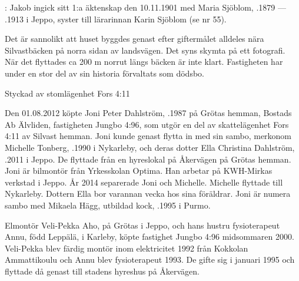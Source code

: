 :
Jakob ingick sitt 1:a äktenskap den 10.11.1901 med Maria Sjöblom, .1879 --- .1913 i Jeppo, syster till lärarinnan Karin Sjöblom (se nr 55).
\begin{jhchildren}
  \item {}
  \item {}
  \item {}
  \item {}
  \item {}
\end{jhchildren}
Det är sannolikt att huset byggdes genast efter giftermålet alldeles nära Silvastbäcken på norra sidan av landsvägen. Det syns skymta på ett fotografi. När det flyttades ca 200 m norrut längs bäcken är inte klart. Fastigheten har under en stor del av sin historia förvaltats som dödsbo.



%

Styckad av stomlägenhet Fors 4:11


%
Den 01.08.2012 köpte Joni Peter Dahlström, .1987 på Grötas hemman, Bostads Ab Älvliden, fastigheten Jungbo 4:96, som	utgör en del av skattelägenhet Fors 4:11 av Silvast hemman. Joni kunde	genast flytta in med sin sambo, merkonom Michelle Tonberg, .1990 i Nykarleby, och deras dotter Ella Christina Dahlström, .2011 i Jeppo. De flyttade från en hyreslokal på Åkervägen på 	Grötas hemman. Joni är bilmontör från Yrkesskolan Optima. Han arbetar på KWH-Mirkas verkstad i Jeppo. År 2014 separerade Joni och Michelle. Michelle flyttade till Nykarleby. Dottern Ella bor varannan vecka hos sina föräldrar. Joni är numera sambo med Mikaela Hägg, utbildad kock, 	.1995 i Purmo.


%
Elmontör Veli-Pekka Aho,  på Grötas i Jeppo, och hans hustru fysioterapeut Annu, född Leppälä,  i Karleby, köpte fastighet Jungbo 4:96 midsommaren 2000. Veli-Pekka blev färdig montör inom elektricitet 1992 från Kokkolan Ammattikoulu och Annu blev fysioterapeut 1993. De gifte sig i januari 1995 och flyttade då genast till stadens hyreshus på Åkervägen.

